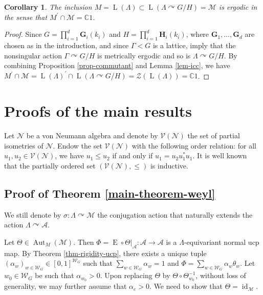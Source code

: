 \documentclass[11pt]{amsart}
\numberwithin{equation}{section}
\theoremstyle{plain}
\newtheorem{cor}[thm]{Corollary}
\theoremstyle{definition}
\newcommand{\C}{\mathbb{C}}
\newcommand{\Aut}{\operatorname{Aut}}
\newcommand{\id}{\operatorname{id}}
\newcommand{\rE}{\operatorname{ E}}
\newcommand{\rL}{\operatorname{ L}}
\begin{document}
\begin{cor}\label{cor-commutant}
The inclusion $M = \rL(\Lambda) \subset \rL(\Lambda \curvearrowright G/H) = \mathscr M$ is ergodic in the sense that $M^\prime \cap \mathscr M = \C 1$.
\end{cor}

\begin{proof}
Since $G = \prod_{i = 1}^d \mathbf G_i(k_i)$ and $H = \prod_{i = 1}^d \mathbf H_i(k_i)$, where $\mathbf G_1, \dots, \mathbf G_d$ are chosen as in the introduction, and since $\Gamma < G$ is a lattice, \cite[Theorem 6.6 and Corollary 6.7]{BG14} imply that the nonsingular action $\Gamma \curvearrowright G/H$ is metrically ergodic and so is $\Lambda \curvearrowright G/H$. By combining Proposition \ref{prop-commutant} and Lemma \ref{lem-icc}, we have $M^\prime \cap \mathscr M = \rL(\Lambda)^\prime \cap \rL(\Lambda \curvearrowright G/H) = \mathscr Z(\rL(\Lambda)) = \C 1$.
\end{proof}

\section{Proofs of the main results} 

Let $\mathscr N$ be a von Neumann algebra and denote by $\mathscr V(\mathscr N)$ the set of partial isometries of $\mathscr N$. Endow the set $\mathscr V(\mathscr N)$ with the following order relation: for all $u_1, u_2 \in \mathscr V(\mathscr N)$, we have $u_1 \leq u_2$ if and only if $u_1 = u_2 u_1^*u_1$. It is well known that the partially ordered set $(\mathscr V(\mathscr N), \leq)$ is inductive.

\subsection{Proof of Theorem \ref{main-theorem-weyl}}

We still denote by $\sigma : \Lambda \curvearrowright \mathscr M$ the conjugation action that naturally extends the action $\Lambda \curvearrowright \mathscr A$.

Let $\Theta \in \Aut_M(\mathscr M)$. Then $\Phi = \rE \circ \Theta|_{\mathscr A} : \mathscr A \to \mathscr A$ is a $\Lambda$-equivariant normal ucp map. By Theorem \ref{thm-rigidity-ucp}, there exists a unique tuple $(\alpha_w)_{w \in \mathscr W_G} \in [0, 1]^{\mathscr W_G}$ such that $\sum_{w \in \mathscr W_G} \alpha_w = 1$ and $\Phi = \sum_{w \in \mathscr W_G} \alpha_w \theta_w$. Let $w_0 \in \mathscr W_G$ be such that $\alpha_{w_0} > 0$. Upon replacing $\Theta$ by $\Theta \circ \Theta_{w_0}^{-1}$, without loss of generality, we may further assume that $\alpha_e > 0$. We need to show that $\Theta = \id_{\mathscr M}$.
\end{document}
